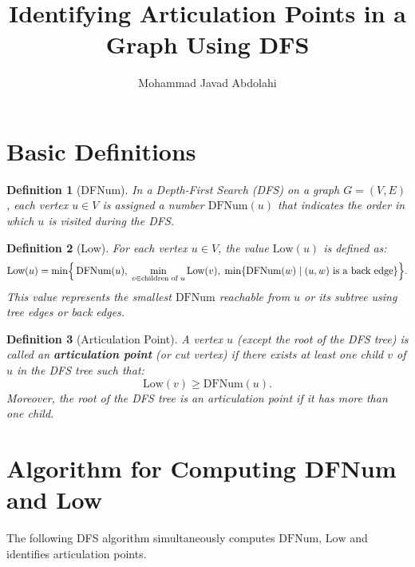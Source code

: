 \documentclass[a4paper,12pt]{article}
\title{Identifying Articulation Points in a Graph Using DFS}
\author{Mohammad Javad Abdolahi}
\date{}
\newcommand{\EN}[1]{\text{#1}}
\newtheorem{definition}{Definition}[section]
\begin{document}
	
	\maketitle
	
	\section{Basic Definitions}
	
	\begin{definition}[DFNum]
		In a Depth‑First Search (DFS) on a graph \(G = (V, E)\), each vertex \(u \in V\) is assigned a number \(\EN{DFNum}(u)\) that indicates the order in which \(u\) is visited during the DFS.
	\end{definition}
	
	\begin{definition}[Low]
		For each vertex \(u \in V\), the value \(\EN{Low}(u)\) is defined as:
		\[
		\EN{Low}(u)
		= \min\Bigl\{\,
		\EN{DFNum}(u),\;
		\min_{v \in \text{children of } u} \EN{Low}(v),\;
		\min\{\EN{DFNum}(w) \mid (u,w) \text{ is a back edge}\}
		\Bigr\}.
		\]
		This value represents the smallest \(\EN{DFNum}\) reachable from \(u\) or its subtree using tree edges or back edges.
	\end{definition}
	
	\begin{definition}[Articulation Point]
		A vertex \(u\) (except the root of the DFS tree) is called an \textbf{articulation point} (or cut vertex) if there exists at least one child \(v\) of \(u\) in the DFS tree such that:
		\[
		\EN{Low}(v) \ge \EN{DFNum}(u).
		\]
		Moreover, the root of the DFS tree is an articulation point if it has more than one child.
	\end{definition}
	
	\newpage
	\section{Algorithm for Computing DFNum and Low}
	
	The following DFS algorithm simultaneously computes \(\EN{DFNum}\), \(\EN{Low}\) and identifies articulation points.
	
\end{document}

